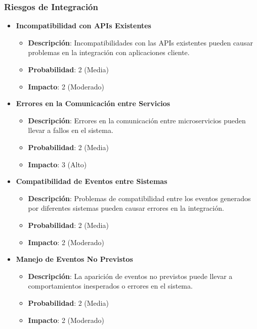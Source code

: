 \subsubsection{Riesgos de Integración}

\begin{itemize}
    \item \textbf{Incompatibilidad con APIs Existentes}
          \begin{itemize}
              \item \textbf{Descripción}: Incompatibilidades con las APIs existentes pueden causar problemas en la integración con aplicaciones cliente.
              \item \textbf{Probabilidad}: 2 (Media)
              \item \textbf{Impacto}: 2 (Moderado)
          \end{itemize}

    \item \textbf{Errores en la Comunicación entre Servicios}
          \begin{itemize}
              \item \textbf{Descripción}: Errores en la comunicación entre microservicios pueden llevar a fallos en el sistema.
              \item \textbf{Probabilidad}: 2 (Media)
              \item \textbf{Impacto}: 3 (Alto)
          \end{itemize}

    \item \textbf{Compatibilidad de Eventos entre Sistemas}
          \begin{itemize}
              \item \textbf{Descripción}: Problemas de compatibilidad entre los eventos generados por diferentes sistemas pueden causar errores en la integración.
              \item \textbf{Probabilidad}: 2 (Media)
              \item \textbf{Impacto}: 2 (Moderado)
          \end{itemize}

    \item \textbf{Manejo de Eventos No Previstos}
          \begin{itemize}
              \item \textbf{Descripción}: La aparición de eventos no previstos puede llevar a comportamientos inesperados o errores en el sistema.
              \item \textbf{Probabilidad}: 2 (Media)
              \item \textbf{Impacto}: 2 (Moderado)
          \end{itemize}
\end{itemize}

